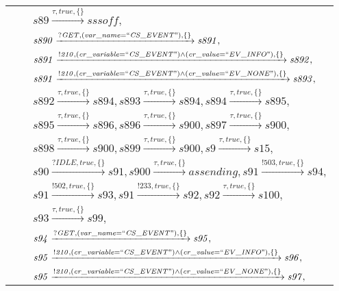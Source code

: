 \begin{tabular}{lcl}
& & $\mathit{s89}\xrightarrow{\mathit{\tau}, \mathit{true}, \{\}}\mathit{sssoff},$ \\
& & $\mathit{s890}\xrightarrow{\mathit{?GET}, \mathit{(var\_name = ``CS\_EVENT")}, \{\}}\mathit{s891},$ \\
& & $\mathit{s891}\xrightarrow{\mathit{!210}, \mathit{(cr\_variable = ``CS\_EVENT") \land (cr\_value = ``EV\_INFO")}, \{\}}\mathit{s892},$ \\
& & $\mathit{s891}\xrightarrow{\mathit{!210}, \mathit{(cr\_variable = ``CS\_EVENT") \land (cr\_value = ``EV\_NONE")}, \{\}}\mathit{s893},$ \\
& & $\mathit{s892}\xrightarrow{\mathit{\tau}, \mathit{true}, \{\}}\mathit{s894},\mathit{s893}\xrightarrow{\mathit{\tau}, \mathit{true}, \{\}}\mathit{s894},\mathit{s894}\xrightarrow{\mathit{\tau}, \mathit{true}, \{\}}\mathit{s895},$ \\
& & $\mathit{s895}\xrightarrow{\mathit{\tau}, \mathit{true}, \{\}}\mathit{s896},\mathit{s896}\xrightarrow{\mathit{\tau}, \mathit{true}, \{\}}\mathit{s900},\mathit{s897}\xrightarrow{\mathit{\tau}, \mathit{true}, \{\}}\mathit{s900},$ \\
& & $\mathit{s898}\xrightarrow{\mathit{\tau}, \mathit{true}, \{\}}\mathit{s900},\mathit{s899}\xrightarrow{\mathit{\tau}, \mathit{true}, \{\}}\mathit{s900},\mathit{s9}\xrightarrow{\mathit{\tau}, \mathit{true}, \{\}}\mathit{s15},$ \\
& & $\mathit{s90}\xrightarrow{\mathit{?IDLE}, \mathit{true}, \{\}}\mathit{s91},\mathit{s900}\xrightarrow{\mathit{\tau}, \mathit{true}, \{\}}\mathit{assending},\mathit{s91}\xrightarrow{\mathit{!503}, \mathit{true}, \{\}}\mathit{s94},$ \\
& & $\mathit{s91}\xrightarrow{\mathit{!502}, \mathit{true}, \{\}}\mathit{s93},\mathit{s91}\xrightarrow{\mathit{!233}, \mathit{true}, \{\}}\mathit{s92},\mathit{s92}\xrightarrow{\mathit{\tau}, \mathit{true}, \{\}}\mathit{s100},$ \\
& & $\mathit{s93}\xrightarrow{\mathit{\tau}, \mathit{true}, \{\}}\mathit{s99},$ \\
& & $\mathit{s94}\xrightarrow{\mathit{?GET}, \mathit{(var\_name = ``CS\_EVENT")}, \{\}}\mathit{s95},$ \\
& & $\mathit{s95}\xrightarrow{\mathit{!210}, \mathit{(cr\_variable = ``CS\_EVENT") \land (cr\_value = ``EV\_INFO")}, \{\}}\mathit{s96},$ \\
& & $\mathit{s95}\xrightarrow{\mathit{!210}, \mathit{(cr\_variable = ``CS\_EVENT") \land (cr\_value = ``EV\_NONE")}, \{\}}\mathit{s97},$ \\

\end{tabular}
